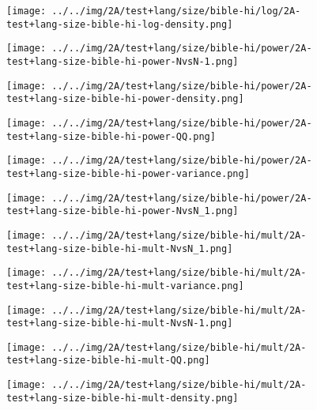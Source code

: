 \begin{figure}[H]
\centering	\texttt{[image: ../../img/2A/test+lang/size/bible-hi/log/2A-test+lang-size-bible-hi-log-density.png]}
\end{figure}
\begin{figure}[H]
\centering	\texttt{[image: ../../img/2A/test+lang/size/bible-hi/power/2A-test+lang-size-bible-hi-power-NvsN-1.png]}
\end{figure}
\begin{figure}[H]
\centering	\texttt{[image: ../../img/2A/test+lang/size/bible-hi/power/2A-test+lang-size-bible-hi-power-density.png]}
\end{figure}
\begin{figure}[H]
\centering	\texttt{[image: ../../img/2A/test+lang/size/bible-hi/power/2A-test+lang-size-bible-hi-power-QQ.png]}
\end{figure}
\begin{figure}[H]
\centering	\texttt{[image: ../../img/2A/test+lang/size/bible-hi/power/2A-test+lang-size-bible-hi-power-variance.png]}
\end{figure}
\begin{figure}[H]
\centering	\texttt{[image: ../../img/2A/test+lang/size/bible-hi/power/2A-test+lang-size-bible-hi-power-NvsN\_1.png]}
\end{figure}
\begin{figure}[H]
\centering	\texttt{[image: ../../img/2A/test+lang/size/bible-hi/mult/2A-test+lang-size-bible-hi-mult-NvsN\_1.png]}
\end{figure}
\begin{figure}[H]
\centering	\texttt{[image: ../../img/2A/test+lang/size/bible-hi/mult/2A-test+lang-size-bible-hi-mult-variance.png]}
\end{figure}
\begin{figure}[H]
\centering	\texttt{[image: ../../img/2A/test+lang/size/bible-hi/mult/2A-test+lang-size-bible-hi-mult-NvsN-1.png]}
\end{figure}
\begin{figure}[H]
\centering	\texttt{[image: ../../img/2A/test+lang/size/bible-hi/mult/2A-test+lang-size-bible-hi-mult-QQ.png]}
\end{figure}
\begin{figure}[H]
\centering	\texttt{[image: ../../img/2A/test+lang/size/bible-hi/mult/2A-test+lang-size-bible-hi-mult-density.png]}
\end{figure}
